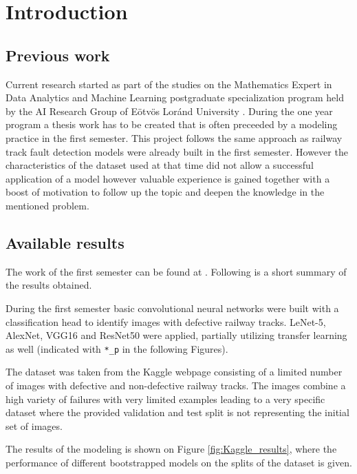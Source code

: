 \section{Introduction}
\subsection{Previous work}
Current research started as part of the studies on the Mathematics Expert in
Data Analytics and Machine Learning postgraduate specialization program \cite{_ai&ml_}
held by the AI Research Group of Eötvös Loránd University \cite{_ai_}.
During the one year program a thesis work has to be created that is often
preceeded by a modeling practice in the first semester.
This project follows the same approach as railway track fault detection models
were already built in the first semester.
However the characteristics of the dataset used at that time did not allow a
successful application of a model however valuable experience is gained together
with a boost of motivation to follow up the topic and deepen the knowledge in the
mentioned problem.

\subsection{Available results}
The work of the first semester can be found at \cite{tomcom_mathemathical_2022}.
Following is a short summary of the results obtained.

During the first semester basic convolutional neural networks were built with a classification
head to identify images with defective railway tracks.
LeNet-5, AlexNet, VGG16 and ResNet50 were applied, partially utilizing transfer learning as well
(indicated with \lstinline{*_p} in the following Figures).

The dataset was taken from the Kaggle webpage \cite{_railway_} consisting of a limited
number of images with defective and non-defective railway tracks.
The images combine a high variety of failures with very limited examples leading to a very
specific dataset where the provided validation and test split is not representing the initial
set of images.

The results of the modeling is shown on Figure \ref{fig:Kaggle_results}, where the performance of
different bootstrapped models on the splits of the dataset is given.

